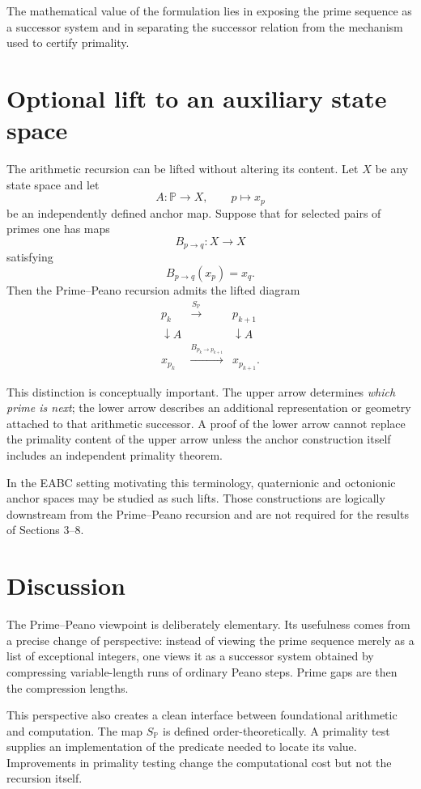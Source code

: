 \documentclass[11pt]{article}
\theoremstyle{definition}
\newcommand{\Pp}{\mathbb{P}}
\newcommand{\SP}{S_{\!\Pp}}
\begin{document}
The mathematical value of the formulation lies in exposing the prime sequence as a successor system and in separating the successor relation from the mechanism used to certify primality.

\section{Optional lift to an auxiliary state space}

The arithmetic recursion can be lifted without altering its content. Let $X$ be any state space and let
\[
A:\Pp\to X,\qquad p\mapsto x_p
\]
be an independently defined anchor map. Suppose that for selected pairs of primes one has maps
\[
B_{p\to q}:X\to X
\]
satisfying
\[
B_{p\to q}(x_p)=x_q.
\]
Then the Prime--Peano recursion admits the lifted diagram
\[
\begin{array}{ccc}
p_k & \xrightarrow{\SP} & p_{k+1}\\
\downarrow A && \downarrow A\\
x_{p_k} & \xrightarrow{B_{p_k\to p_{k+1}}} & x_{p_{k+1}}.
\end{array}
\]

This distinction is conceptually important. The upper arrow determines \emph{which prime is next}; the lower arrow describes an additional representation or geometry attached to that arithmetic successor. A proof of the lower arrow cannot replace the primality content of the upper arrow unless the anchor construction itself includes an independent primality theorem.

In the EABC setting motivating this terminology, quaternionic and octonionic anchor spaces may be studied as such lifts. Those constructions are logically downstream from the Prime--Peano recursion and are not required for the results of Sections 3--8.

\section{Discussion}

The Prime--Peano viewpoint is deliberately elementary. Its usefulness comes from a precise change of perspective: instead of viewing the prime sequence merely as a list of exceptional integers, one views it as a successor system obtained by compressing variable-length runs of ordinary Peano steps. Prime gaps are then the compression lengths.

This perspective also creates a clean interface between foundational arithmetic and computation. The map $\SP$ is defined order-theoretically. A primality test supplies an implementation of the predicate needed to locate its value. Improvements in primality testing change the computational cost but not the recursion itself.
\end{document}

